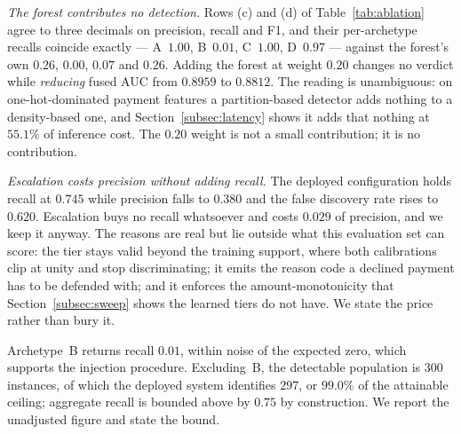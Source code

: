 \documentclass[conference]{IEEEtran}
\begin{document}
\emph{The forest contributes no detection.} Rows (c) and (d) of
Table~\ref{tab:ablation} agree to three decimals on precision, recall
and F1, and their per-archetype recalls coincide exactly --- A~$1.00$,
B~$0.01$, C~$1.00$, D~$0.97$ --- against the forest's own $0.26$,
$0.00$, $0.07$ and $0.26$. Adding the forest at weight $0.20$ changes
no verdict while \emph{reducing} fused AUC from $0.8959$ to $0.8812$.
The reading is unambiguous: on one-hot-dominated payment features a
partition-based detector adds nothing to a density-based one, and
Section~\ref{subsec:latency} shows it adds that nothing at
$55.1\%$ of inference cost. The $0.20$ weight is not a small
contribution; it is no contribution.

\emph{Escalation costs precision without adding recall.} The deployed
configuration holds recall at $0.745$ while precision falls to $0.380$
and the false discovery rate rises to $0.620$. Escalation buys no
recall whatsoever and costs $0.029$ of precision, and we keep it
anyway. The reasons are real but lie outside what this evaluation set
can score: the tier stays valid beyond the training support, where both
calibrations clip at unity and stop discriminating; it emits the reason
code a declined payment has to be defended with; and it enforces the
amount-monotonicity that Section~\ref{subsec:sweep} shows the learned
tiers do not have. We state the price rather than bury it.

Archetype~B returns recall $0.01$, within noise of the expected zero,
which supports the injection procedure. Excluding~B, the detectable
population is $300$ instances, of which the deployed system identifies
$297$, or $99.0\%$ of the attainable ceiling; aggregate recall is
bounded above by $0.75$ by construction. We report the unadjusted
figure and state the bound.
\end{document}
